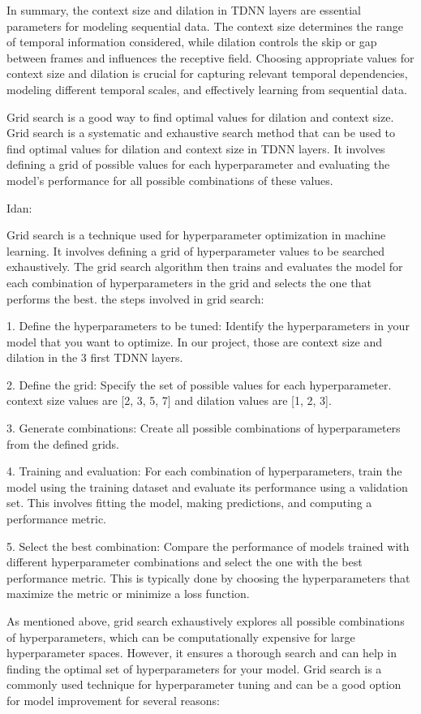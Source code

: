 \documentclass[a4paper]{article}
\begin{document}
In summary, the context size and dilation in TDNN layers are essential parameters for modeling sequential data. The context size determines the range of temporal information considered, while dilation controls the skip or gap between frames and influences the receptive field. Choosing appropriate values for context size and dilation is crucial for capturing relevant temporal dependencies, modeling different temporal scales, and effectively learning from sequential data. 

Grid search is a good way to find optimal values for dilation and context size. Grid search is a systematic and exhaustive search method that can be used to find optimal values for dilation and context size in TDNN layers. It involves defining a grid of possible values for each hyperparameter and evaluating the model's performance for all possible combinations of these values.

Idan:

Grid search is a technique used for hyperparameter optimization in machine learning. It involves defining a grid of hyperparameter values to be searched exhaustively. The grid search algorithm then trains and evaluates the model for each combination of hyperparameters in the grid and selects the one that performs the best.
the steps involved in grid search:

1. Define the hyperparameters to be tuned: Identify the hyperparameters in your model that you want to optimize. In our project, those are context size and dilation in the 3 first TDNN layers.

2. Define the grid: Specify the set of possible values for each hyperparameter. context size values are [2, 3, 5, 7] and dilation values are [1, 2, 3].

3. Generate combinations: Create all possible combinations of hyperparameters from the defined grids.

4. Training and evaluation: For each combination of hyperparameters, train the model using the training dataset and evaluate its performance using a validation set. This involves fitting the model, making predictions, and computing a performance metric.

5. Select the best combination: Compare the performance of models trained with different hyperparameter combinations and select the one with the best performance metric. This is typically done by choosing the hyperparameters that maximize the metric or minimize a loss function.

As mentioned above, grid search exhaustively explores all possible combinations of hyperparameters, which can be computationally expensive for large hyperparameter spaces. However, it ensures a thorough search and can help in finding the optimal set of hyperparameters for your model. Grid search is a commonly used technique for hyperparameter tuning and can be a good option for model improvement for several reasons:
\end{document}

